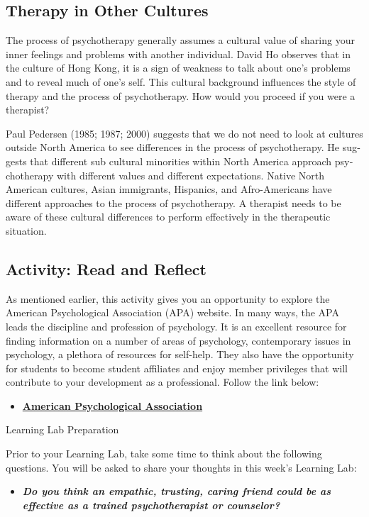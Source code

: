 \documentclass[
]{book}
\providecommand{\tightlist}{%
  \setlength{\itemsep}{0pt}\setlength{\parskip}{0pt}}
\begin{document}
\hypertarget{therapy-in-other-cultures-1}{%
\subsection*{Therapy in Other Cultures}\label{therapy-in-other-cultures-1}}

The process of psychotherapy generally assumes a cultural value of sharing your inner feelings and problems with another individual. David Ho observes that in the culture of Hong Kong, it is a sign of weakness to talk about one's problems and to reveal much of one's self. This cultural background influences the style of therapy and the process of psychotherapy. How would you proceed if you were a therapist?

Paul Pedersen (1985; 1987; 2000) suggests that we do not need to look at cultures outside North America to see differences in the process of psychotherapy. He sug­gests that different sub cultural minorities within North America approach psy­chotherapy with different values and different expectations. Native North American cultures, Asian immigrants, Hispanics, and Afro-Americans have different approaches to the pro­cess of psychotherapy. A therapist needs to be aware of these cultural differ­ences to perform effectively in the therapeutic situation.

\hypertarget{activity-read-and-reflect-25}{%
\subsection*{Activity: Read and Reflect}\label{activity-read-and-reflect-25}}

\begin{reflect}
As mentioned earlier, this activity gives you an opportunity to explore the American Psychological Association (APA) website. In many ways, the APA leads the discipline and profession of psychology. It is an excellent resource for finding information on a number of areas of psychology, contemporary issues in psychology, a plethora of resources for self-help. They also have the opportunity for students to become student affiliates and enjoy member privileges that will contribute to your development as a professional. Follow the link below:

\begin{itemize}
\tightlist
\item
  \href{https://www.apa.org/}{\textbf{American Psychological Association}}
\end{itemize}

{Learning Lab Preparation}

Prior to your Learning Lab, take some time to think about the following questions. You will be asked to share your thoughts in this week's Learning Lab:

\begin{itemize}
\tightlist
\item
  \textbf{\emph{Do you think an empathic, trusting, caring friend could be as effective as a trained psychotherapist or counselor?}}
\end{itemize}
\end{reflect}
\end{document}
